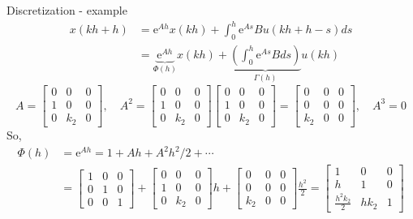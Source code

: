 \documentclass[presentation,aspectratio=1610]{beamer}
\begin{document}
\begin{frame}[label={sec:orge94101e}]{Discretization - example}
 \begin{align*}
  x(kh+h) &= \mathrm{e}^{Ah} x(kh) + \int_{0}^{h} \mathrm{e}^{As} B u(kh+h-s) ds\\
   &= \underbrace{\mathrm{e}^{Ah}}_{\Phi(h)} x(kh) + \underbrace{\left(\int_{0}^h \mathrm{e}^{As} B ds \right)}_{\Gamma(h)} u(kh)
\end{align*}
\[ A = \begin{bmatrix} 0 & 0 & 0\\1 & 0 & 0\\0 & k_2 & 0\end{bmatrix}, \quad A^2 = \begin{bmatrix} 0 & 0 & 0\\1 & 0 & 0\\0 & k_2 & 0\end{bmatrix}\begin{bmatrix} 0 & 0 & 0\\1 & 0 & 0\\0 & k_2 & 0\end{bmatrix}= \begin{bmatrix} 0 & 0 & 0\\0 & 0 & 0\\k_2 & 0  & 0\end{bmatrix}, \quad A^3 = 0\]
So,
\begin{align*}
 \Phi(h) &= \mathrm{e}^{Ah} = 1 + Ah + A^2 h^2/2  + \cdots \\
 &= \begin{bmatrix} 1 & 0 & 0\\0 & 1 & 0\\0 & 0 & 1\end{bmatrix} + \begin{bmatrix} 0 & 0 & 0\\1 & 0 & 0\\0 & k_2 & 0\end{bmatrix}h + \begin{bmatrix} 0 & 0 & 0\\0 & 0 & 0\\k_2 & 0 & 0\end{bmatrix}\frac{h^ 2}{2}= \begin{bmatrix} 1 & 0 & 0\\h & 1 & 0\\\frac{h^2k_2}{2} & hk_2 & 1\end{bmatrix}
 \end{align*}
\end{frame}
\end{document}
